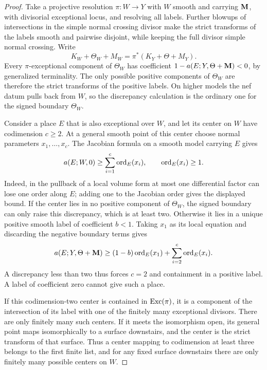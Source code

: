\begin{proof}
Take a projective resolution \(\pi:W\to Y\) with \(W\) smooth and carrying \(\mathbf{M}\),
with divisorial exceptional locus, and resolving all labels.  Further
blowups of intersections in the simple normal crossing divisor make the
strict transforms of the labels smooth and pairwise disjoint, while keeping
the full divisor simple normal crossing.  Write
\[
 K_W+\Theta_W+M_W=\pi^*(K_Y+\Theta+M_Y).
\]
Every \(\pi\)-exceptional component of \(\Theta_W\) has coefficient
\(1-a(E;Y,\Theta+\mathbf{M})<0\), by generalized terminality.  The only possible
positive components of \(\Theta_W\) are therefore the strict transforms
of the positive labels.  On higher models the nef datum pulls back from \(W\), so the
discrepancy calculation is the ordinary one for the signed boundary
\(\Theta_W\).

Consider a place \(E\) that is also exceptional over \(W\), and let its
center on \(W\) have codimension \(c\geq2\).  At a general smooth point
of this center choose normal parameters \(x_1,\ldots,x_c\).  The Jacobian
formula on a smooth model carrying \(E\) gives
\[
 a(E;W,0)\geq\sum_{i=1}^c\operatorname{ord}_E(x_i),
 \qquad \operatorname{ord}_E(x_i)\geq1.
\]
Indeed, in the pullback of a local volume form at most one differential
factor can lose one order along \(E\); adding one to the Jacobian order
gives the displayed bound.  If the center lies in no positive component of
\(\Theta_W\), the signed boundary can only raise this discrepancy, which
is at least two.  Otherwise it lies in a unique positive smooth label of
coefficient \(b<1\).  Taking \(x_1\) as its local equation and discarding
the negative boundary terms gives
\begin{equation}\label{eq:local-discrepancy-estimate}
 a(E;Y,\Theta+\mathbf{M})
 \geq (1-b)\operatorname{ord}_E(x_1)+\sum_{i=2}^c\operatorname{ord}_E(x_i).
\end{equation}
A discrepancy less than two thus forces \(c=2\) and containment in a
positive label.  A label of coefficient zero cannot give such a place.

If this codimension-two center is contained in \(\operatorname{Exc}(\pi)\), it is a
component of the intersection of its label with one of the finitely many
exceptional divisors.  There are only finitely many such centers.  If it
meets the isomorphism open, its general point maps isomorphically to a
surface downstairs, and the center is the strict transform of that surface.
Thus a center mapping to codimension at least three belongs to the first
finite list, and for any fixed surface downstairs there are only finitely
many possible centers on \(W\).


\end{proof}
